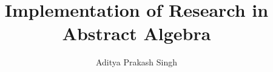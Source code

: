 \documentclass[a4paper,11pt]{article}
\begin{document}
\title{Implementation of Research in Abstract Algebra}
\author{Aditya Prakash Singh}
\def\studyno{12345678}
\def\handindate{4th June 2017}

\maketitle



\end{document}
